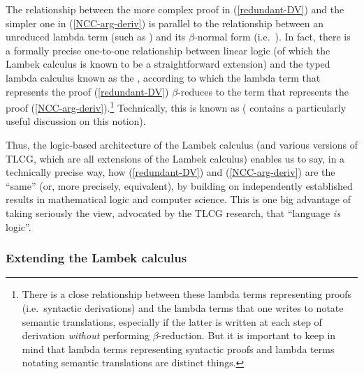 \documentclass[output=paper
                ,modfonts
                ,nonflat
	        ,collection
	        ,collectionchapter
	        ,collectiontoclongg
 	        ,biblatex
                ,babelshorthands
                ,newtxmath
                ,draftmode
                ,colorlinks, citecolor=brown
]{./langsci/langscibook}
\begin{document}
The relationship between the more complex proof in (\ref{redundant-DV}) and
the simpler one in (\ref{NCC-arg-deriv}) is parallel to the relationship
between an unreduced lambda term (such as
)
and its
$\beta$-normal form (i.e.\  ).
In fact, there is a formally precise
one-to-one relationship between linear logic (of which the Lambek calculus is known
to be a straightforward extension) and the typed lambda calculus known
as the  \citep{howard1969}, according to which
the lambda term that represents the proof 
(\ref{redundant-DV}) $\beta$-reduces  to the term that represents the proof
(\ref{NCC-arg-deriv}).\footnote{There is a close relationship between these
lambda terms representing proofs (i.e.\ syntactic derivations) and the
lambda  terms that one writes 
to notate semantic translations, especially if the latter is written 
at each step of derivation \emph{without} performing $\beta$-reduction. But
it is important to keep in mind that
lambda terms representing syntactic proofs
and lambda terms notating semantic translations are distinct things.}
Technically, this is known as 
(\citealt{jaeger05} contains a particularly useful discussion on this notion). 

Thus, the logic-based architecture of the Lambek calculus (and various versions of
TLCG, which are all extensions of the Lambek calculus) enables us to say, in a
technically precise way, how (\ref{redundant-DV}) and (\ref{NCC-arg-deriv}) are
the ``same'' (or, more precisely, equivalent), by building on
independently established results in mathematical logic and computer
science. This is one big advantage of taking seriously the view,
advocated by the TLCG research, that ``language \emph{is} logic''.


\subsubsection{Extending the Lambek calculus \label{sec:extending}}
\end{document}
